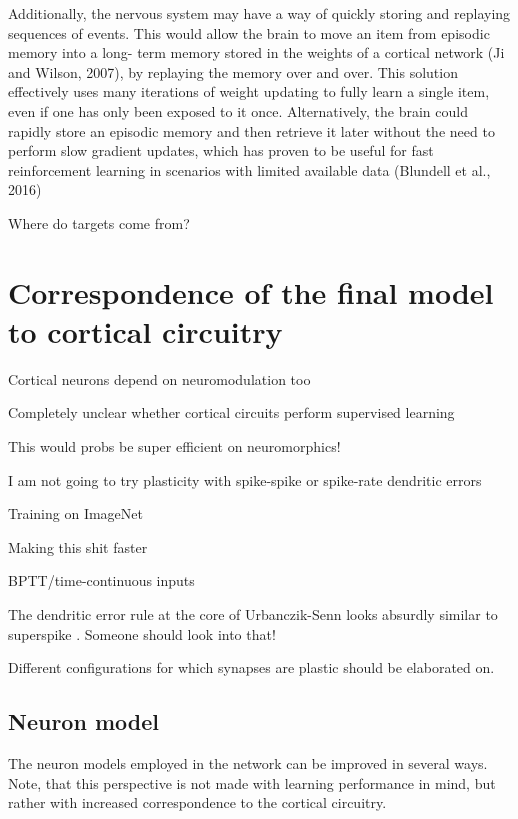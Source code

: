 Additionally, the nervous system may have a way of quickly
storing and replaying sequences of events. This would allow
the brain to move an item from episodic memory into a long-
term memory stored in the weights of a cortical network (Ji and
Wilson, 2007), by replaying the memory over and over. This
solution effectively uses many iterations of weight updating to
fully learn a single item, even if one has only been exposed to
it once. Alternatively, the brain could rapidly store an episodic
memory and then retrieve it later without the need to perform
slow gradient updates, which has proven to be useful for
fast reinforcement learning in scenarios with limited available
data (Blundell et al., 2016)


Where do targets come from? \cite{Bengio2015}


\section{Correspondence of the final model to cortical circuitry}

Cortical neurons depend on neuromodulation too \cite{Roelfsema2018}

Completely unclear whether cortical circuits perform supervised learning \citep{magee2020synaptic}


This would probs be super efficient on neuromorphics!

I am not going to try plasticity with spike-spike or spike-rate dendritic errors

Training on ImageNet

Making this shit faster

BPTT/time-continuous inputs


The dendritic error rule at the core of Urbanczik-Senn looks absurdly similar to superspike \citep{Zenke2018}.
Someone should look into that!

Different configurations for which synapses are plastic should be elaborated on.


\subsection{Neuron model}


The neuron models employed in the network can be improved in several ways. Note, that this perspective is not made with
learning performance in mind, but rather with increased correspondence to the cortical circuitry.



